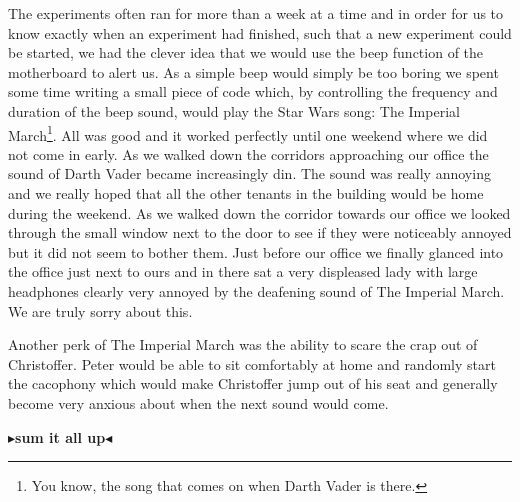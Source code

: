 \documentclass[twoside,11pt,openright]{report}
\newcommand{\todo}[1]{{\color[rgb]{.5,0,0}\textbf{$\blacktriangleright$#1$\blacktriangleleft$}}}
\begin{document}
The experiments often ran for more than a week at a time and in order for us to know exactly when an experiment had finished, such that a new experiment could be started, we had the clever idea that we would use the beep function of the motherboard to alert us. As a simple beep would simply be too boring we spent some time writing a small piece of code which, by controlling the frequency and duration of the beep sound, would play the Star Wars song: The Imperial March\footnote{You know, the song that comes on when Darth Vader is there.}. All was good and it worked perfectly until one weekend where we did not come in early. As we walked down the corridors approaching our office the sound of Darth Vader became increasingly din. The sound was really annoying and we really hoped that all the other tenants in the building would be home during the weekend. As we walked down the corridor towards our office we looked through the small window next to the door to see if they were noticeably annoyed but it did not seem to bother them. Just before our office we finally glanced into the office just next to ours and in there sat a very displeased lady with large headphones clearly very annoyed by the deafening sound of The Imperial March. We are truly sorry about this.

Another perk of The Imperial March was the ability to scare the crap out of Christoffer. Peter would be able to sit comfortably at home and randomly start the cacophony which would make Christoffer jump out of his seat and generally become very anxious about when the next sound would come.

\todo{sum it all up}
\end{document}
